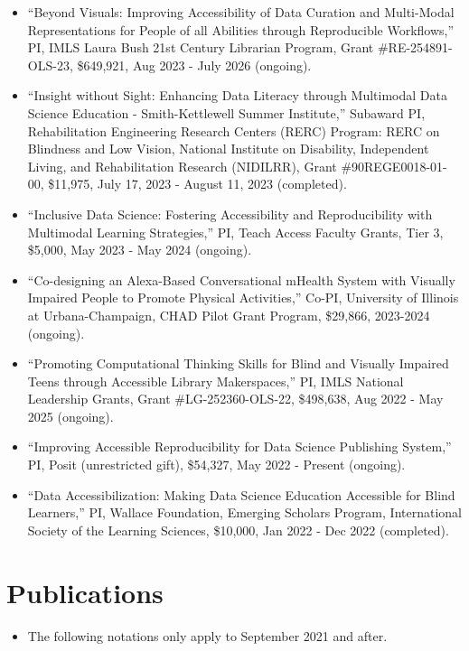 \documentclass[11pt,a4paper,]{awesome-cv}
\providecommand{\tightlist}{%
	\setlength{\itemsep}{0pt}\setlength{\parskip}{0pt}}
\begin{document}
\begin{itemize}
\item
  ``Beyond Visuals: Improving Accessibility of Data Curation and
  Multi-Modal Representations for People of all Abilities through
  Reproducible Workflows,'' PI, IMLS Laura Bush 21st Century Librarian
  Program, Grant \#RE-254891-OLS-23, \$649,921, Aug 2023 - July 2026
  (ongoing).
\item
  ``Insight without Sight: Enhancing Data Literacy through Multimodal
  Data Science Education - Smith-Kettlewell Summer Institute,'' Subaward
  PI, Rehabilitation Engineering Research Centers (RERC) Program: RERC
  on Blindness and Low Vision, National Institute on Disability,
  Independent Living, and Rehabilitation Research (NIDILRR), Grant
  \#90REGE0018-01-00, \$11,975, July 17, 2023 - August 11, 2023
  (completed).
\item
  ``Inclusive Data Science: Fostering Accessibility and Reproducibility
  with Multimodal Learning Strategies,'' PI, Teach Access Faculty
  Grants, Tier 3, \$5,000, May 2023 - May 2024 (ongoing).
\item
  ``Co-designing an Alexa-Based Conversational mHealth System with
  Visually Impaired People to Promote Physical Activities,'' Co-PI,
  University of Illinois at Urbana-Champaign, CHAD Pilot Grant Program,
  \$29,866, 2023-2024 (ongoing).
\item
  ``Promoting Computational Thinking Skills for Blind and Visually
  Impaired Teens through Accessible Library Makerspaces,'' PI, IMLS
  National Leadership Grants, Grant \#LG-252360-OLS-22, \$498,638, Aug
  2022 - May 2025 (ongoing).
\item
  ``Improving Accessible Reproducibility for Data Science Publishing
  System,'' PI, Posit (unrestricted gift), \$54,327, May 2022 - Present
  (ongoing).
\item
  ``Data Accessibilization: Making Data Science Education Accessible for
  Blind Learners,'' PI, Wallace Foundation, Emerging Scholars Program,
  International Society of the Learning Sciences, \$10,000, Jan 2022 -
  Dec 2022 (completed).
\end{itemize}

\hypertarget{publications}{%
\section{Publications}\label{publications}}

\begin{itemize}
\tightlist
\item
  The following notations only apply to September 2021 and after.
\end{itemize}
\end{document}

